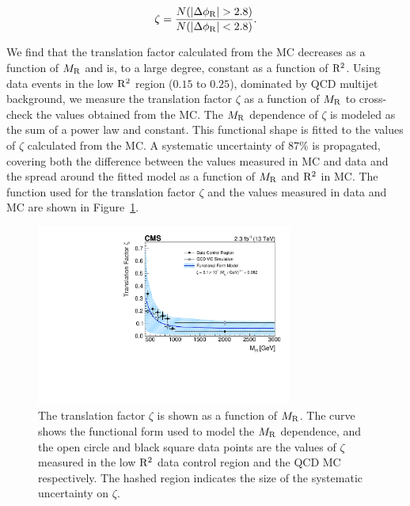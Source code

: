 \begin{equation}
\zeta = \frac{N(|\dPhiR|>2.8)}{N(|\dPhiR|<2.8)}.
\end{equation}

We find that the translation factor calculated from the MC
decreases as a function of $M_\mathrm{R}$ and is, to a large degree, constant as a function of $\mathrm{R}^2$.
Using data events in the low $\mathrm{R}^2$ region ($0.15$ to $0.25$), dominated
by QCD multijet background, we measure the translation factor $\zeta$ as a function of
$M_\mathrm{R}$ to cross-check the values obtained from the MC.
The $M_\mathrm{R}$ dependence of $\zeta$ is modeled as the sum of a power law and constant.  
This functional shape is fitted to the values of $\zeta$ calculated from the MC.
A systematic uncertainty of $87\%$ is propagated, covering both the difference
between the values measured in MC and data and the spread around the
fitted model as a function of $M_\mathrm{R}$ and $\mathrm{R}^2$ in MC. The function used
for the translation factor $\zeta$ and the values measured in data and MC are
shown in Figure~\ref{fig:QCDTranslationFactor}. 

\begin{figure}[!htb]
\begin{center}
\includegraphics[width=0.75\textwidth]{figs/analysis13TeV/npf_vs_mr_razor_fit.pdf}
\caption{\label{fig:QCDTranslationFactor} 
The translation factor $\zeta$ is shown as a function of $M_\mathrm{R}$. The curve shows the 
functional form used to model the $M_\mathrm{R}$ dependence, and the open circle and black square data
points are the values of $\zeta$ measured in the low $\mathrm{R}^2$ data control region and the QCD MC
respectively. The hashed region indicates the size of the systematic uncertainty on
$\zeta$.
}
\end{center}
\end{figure}

